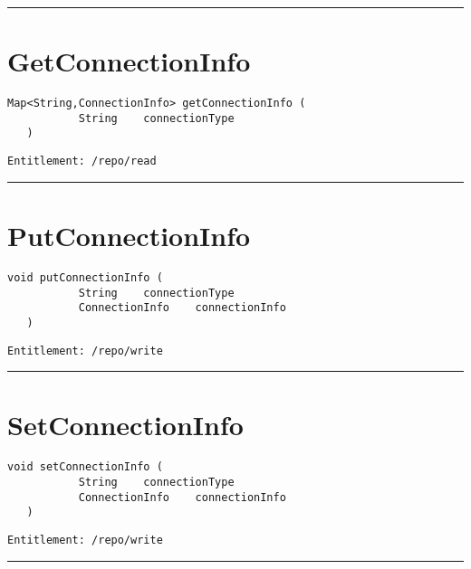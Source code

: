 \rule{12cm}{2pt}
\section{GetConnectionInfo}
\label{Api:GetConnectionInfo}
\begin{lstlisting}[style=nonumbers]
   Map<String,ConnectionInfo> getConnectionInfo (
           String    connectionType
   )
\end{lstlisting}
\begin{Verbatim}[formatcom=\color{Maroon}]
  Entitlement: /repo/read
\end{Verbatim}



\rule{12cm}{2pt}
\section{PutConnectionInfo}
\label{Api:PutConnectionInfo}
\begin{lstlisting}[style=nonumbers]
   void putConnectionInfo (
           String    connectionType
           ConnectionInfo    connectionInfo
   )
\end{lstlisting}
\begin{Verbatim}[formatcom=\color{Maroon}]
  Entitlement: /repo/write
\end{Verbatim}



\rule{12cm}{2pt}
\section{SetConnectionInfo}
\label{Api:SetConnectionInfo}
\begin{lstlisting}[style=nonumbers]
   void setConnectionInfo (
           String    connectionType
           ConnectionInfo    connectionInfo
   )
\end{lstlisting}
\begin{Verbatim}[formatcom=\color{Maroon}]
  Entitlement: /repo/write
\end{Verbatim}



\rule{12cm}{2pt}
